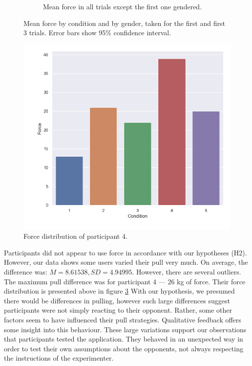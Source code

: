 \begin{figure}[H]
\begin{subfigure}[b]{0.5\textwidth}
     \vspace{-5mm}
     \caption{Mean force in all trials except the first one  gendered.}
     \vspace{-5mm}
     \label{fig:meanFRestGen}
 \end{subfigure}
 \vspace{1mm}
     \caption{Mean force by condition and by gender, taken for the first and first 3 trials. Error bars show 95\%  confidence interval.}
    \label{fig:forceIn1stRest}
\end{figure}
\begin{figure}[H]
\hspace{-10mm}
 \captionsetup{justification=centering,margin=0.1cm}
 \centering
 \includegraphics[width=\linewidth]{Files/Plots/pid_outlier.png}
 \caption{Force distribution of participant 4.}
\label{fig:forceDif}
\end{figure} 
Participants did not appear to use force in accordance with our hypotheses (H2). However, our data shows some users varied their pull very much.
On average, the difference was: $M=8.61538, SD=4.94995$. However, there are several outliers. The maximum pull difference was for participant 4 --- 26 kg of force. Their force distribution is presented above in figure \ref{fig:forceDif} With our hypothesis, we presumed there would be differences in pulling, however such large differences suggest participants were not simply reacting to their opponent. Rather, some other factors seem to have influenced their pull strategies. Qualitative feedback offers some insight into this behaviour. These large variations support our observations that participants tested the application. They behaved in an unexpected way in order to test their own assumptions about the opponents, not always respecting the instructions of the experimenter.\\

